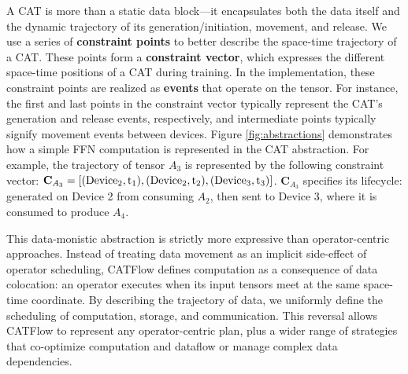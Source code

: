 \documentclass[letterpaper,twocolumn,10pt]{article}
\newcommand{\name}{CATFlow}
\begin{document}

A CAT is more than a static data block—it encapsulates both the data itself and the dynamic trajectory of its generation/initiation, movement, and release. We use a series of \textbf{constraint points} to better describe the space-time trajectory of a CAT. These points form a \textbf{constraint vector}, which expresses the different space-time positions of a CAT during training. In the implementation, these constraint points are realized as \textbf{events} that operate on the tensor. For instance, the first and last points in the constraint vector typically represent the CAT's generation and release events, respectively, and intermediate points typically signify movement events between devices. Figure \ref{fig:abstractions} demonstrates how a simple FFN computation is represented in the CAT abstraction. For example, the trajectory of tensor $A_3$ is represented by the following constraint vector: $\mathbf{C}_{A_3} = [(\rm{Device}_2, t_1), (\rm{Device}_2, t_2), (\rm{Device}_3, t_3)]$.
$\mathbf{C}_{A_3}$ specifies its lifecycle: generated on Device 2 from consuming $A_2$, then sent to Device 3, where it is consumed to produce $A_4$.

This data-monistic abstraction is strictly more expressive than operator-centric approaches. Instead of treating data movement as an implicit side-effect of operator scheduling, \name{} defines computation as a consequence of data colocation: an operator executes when its input tensors meet at the same space-time coordinate. By describing the trajectory of data, we uniformly define the scheduling of computation, storage, and communication. This reversal allows \name{} to represent any operator-centric plan, plus a wider range of strategies that co-optimize computation and dataflow or manage complex data dependencies.
\end{document}
